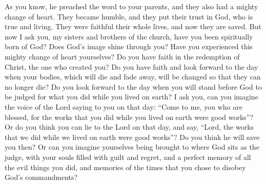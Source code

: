As you know, he preached the word to your parents, and they also had a mighty change of heart. They became humble, and they put their trust in God, who is true and living. They were faithful their whole lives, and now they are saved.
\bverse \iffalse And now behold, I ask of you, my brethren of the church, have ye spiritually been born of God? Have ye received his image in your countenances? Have ye experienced this mighty change in your hearts? \fi
But now I ask you, my sisters and brothers of the church, have you been spiritually born of God? Does God's image shine through you? Have you experienced this mighty change of heart yourselves?
\bverse \iffalse Do ye exercise faith in the redemption of him who created you? Do you look forward with an eye of faith, and view this mortal body raised in immortality, and this corruption raised in incorruption, to stand before God to be judged according to the deeds which have been done in the mortal body? \fi
Do you have faith in the redemption of Christ, the one who created you? Do you have faith and look forward to the day when your bodies, which will die and fade away, will be changed so that they can no longer die? Do you look forward to the day when you will stand before God to be judged for what you did while you lived on earth?
\bverse \iffalse I say unto you, can you imagine to yourselves that ye hear the voice of the Lord, saying unto you, in that day: Come unto me ye blessed, for behold, your works have been the works of righteousness upon the face of the earth? \fi
I ask you, can you imagine the voice of the Lord saying to you on that day: ``Come to me, you who are blessed, for the works that you did while you lived on earth were good works''?
\bverse \iffalse Or do ye imagine to yourselves that ye can lie unto the Lord in that day, and say--Lord, our works have been righteous works upon the face of the earth--and that he will save you? \fi
Or do you think you can lie to the Lord on that day, and say, ``Lord, the works that we did while we lived on earth were good works''? Do you think he will save you then?
\bverse \iffalse Or otherwise, can ye imagine yourselves brought before the tribunal of God with your souls filled with guilt and remorse, having a remembrance of all your guilt, yea, a perfect remembrance of all your wickedness, yea, a remembrance that ye have set at defiance the commandments of God? \fi
Or can you imagine yourselves being brought to where God sits as the judge, with your souls filled with guilt and regret, and a perfect memory of all the evil things you did, and memories of the times that you chose to disobey God's commandments?
